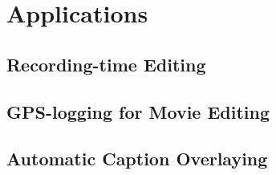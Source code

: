\chapter{Applications}


\section{Recording-time Editing}


\section{GPS-logging for Movie Editing}


\section{Automatic Caption Overlaying}

